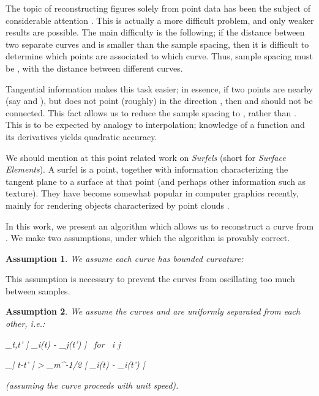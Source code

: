 \documentclass{article}
\newtheorem{assumption}{Assumption}
\numberwithin{cntr}{section}
\numberwithin{equation}{section}
\newcommand{\abs}[1]{\left| #1 \right|}\newcommand{\absSmall}[1]{| #1 |}\newcommand{\RR}[0]{{\mathbb{R}}}
\newcommand{\curvemax}{{\kappa_{m}}}
\newcommand{\curvemaxi}{{\curvemax^{-1}}}
\newcommand{\curvesep}{{\delta}}
\begin{document}
The topic of reconstructing figures solely from point data  has been the subject of considerable attention \cite{amenta98crust,amenta98new,dey99curve,hoppe92surface,amenta02simple, dey01reconstructing, edelsbrunner}. This is actually a more difficult problem, and only weaker results are possible. The main difficulty is the following; if the distance between two separate curves  and  is smaller than the sample spacing, then it is difficult to determine which points are associated to which curve. Thus, sample spacing must be , with  the distance between different curves.

Tangential information makes this task easier; in essence, if two points are nearby (say  and ), but  does not point (roughly) in the direction , then  and  should not be connected. This fact allows us to reduce the sample spacing to , rather than . This is to be expected by analogy to interpolation; knowledge of a function and its derivatives yields quadratic accuracy.

We should mention at this point related work on \emph{Surfels} (short for \emph{Surface Elements}). A surfel is a point, together with information characterizing the tangent plane to a surface at that point (and perhaps other information such as texture). They have become somewhat popular in computer graphics recently, mainly for rendering objects characterized by point clouds
\cite{882320,1103907,598521,1018057,344936,383300}.

In this work, we present an algorithm which allows us to reconstruct a curve from . We make two assumptions, under which the algorithm is provably correct.

\begin{assumption}
  \label{ass:curvature}
  We assume each curve  has bounded curvature:
  
\end{assumption}

This assumption is necessary to prevent the curves from oscillating too much between samples.

\begin{assumption}
  \label{ass:separation}
  We assume the curves  and  are uniformly separated from each other, i.e.:
  
      \label{eq:separationAssumption}
      \inf_{t,t'} \abs{ \gamma_{i}(t) - \gamma_{j}(t')} \geq \curvesep \textrm{~for~} i \neq j
    
      \label{eq:separationAssumptionSameCurve}
      \inf_{\abs{t-t'} > \curvemaxi\pi/2 } \abs{ \gamma_{i}(t) - \gamma_{i}(t')} \geq \curvesep
    
  (assuming the curve  proceeds with unit speed).
\end{assumption}
\end{document}
